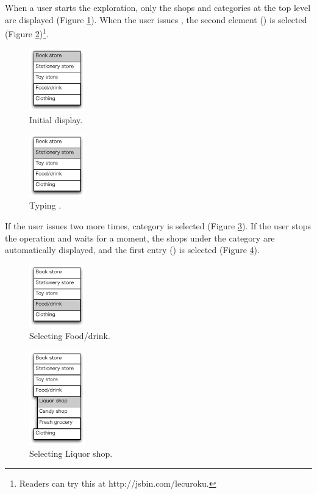 \documentclass{article}
\begin{document}
When a user starts the exploration, only the shops and categories
at the top level are displayed (Figure \ref{fig2}).
When the user issues {\D},
the second element () is selected (Figure \ref{fig3})\footnote{
  Readers can try this at \textsf{http://jsbin.com/lecuroku}.
}.

\begin{figure}[H]
\centerline{\includegraphics[width=24mm,bb=0 0 139 157]{figures/fig2.pdf}}
\caption{Initial display.}
\label{fig2}
\end{figure}

\begin{figure}[H]
\centerline{\includegraphics[width=24mm,bb=0 0 139 157]{figures/fig3.pdf}}
\caption{Typing {\D}.}
\label{fig3}
\end{figure}

If the user issues {\D} two more times, 
 category is selected (Figure \ref{fig4}).
If the user stops the operation and waits for a moment, the shops under the 
category are automatically displayed,
and the first entry () is selected (Figure \ref{fig5}).

\begin{figure}[H]
\centerline{\includegraphics[width=24mm,bb=0 0 139 157]{figures/fig4.pdf}}
\caption{Selecting Food/drink.}
\label{fig4}
\end{figure}

\begin{figure}[H]
\centerline{\includegraphics[width=24mm,bb=0 0 139 238]{figures/fig5.pdf}}
\caption{Selecting Liquor shop.}
\label{fig5}
\end{figure}
\end{document}
